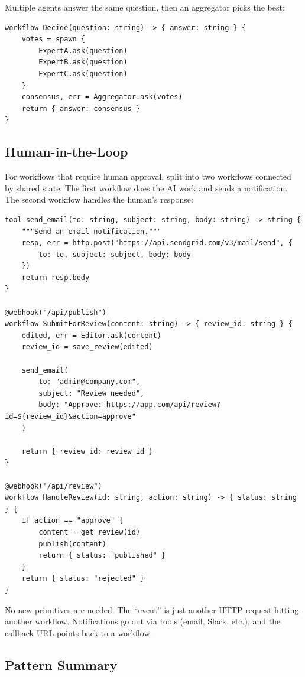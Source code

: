 Multiple agents answer the same question, then an aggregator picks the best:

\begin{lstlisting}
workflow Decide(question: string) -> { answer: string } {
    votes = spawn {
        ExpertA.ask(question)
        ExpertB.ask(question)
        ExpertC.ask(question)
    }
    consensus, err = Aggregator.ask(votes)
    return { answer: consensus }
}
\end{lstlisting}

\subsection{Human-in-the-Loop}

For workflows that require human approval, split into two workflows connected by shared state. The first workflow does the AI work and sends a notification. The second workflow handles the human's response:

\begin{lstlisting}
tool send_email(to: string, subject: string, body: string) -> string {
    """Send an email notification."""
    resp, err = http.post("https://api.sendgrid.com/v3/mail/send", {
        to: to, subject: subject, body: body
    })
    return resp.body
}

@webhook("/api/publish")
workflow SubmitForReview(content: string) -> { review_id: string } {
    edited, err = Editor.ask(content)
    review_id = save_review(edited)

    send_email(
        to: "admin@company.com",
        subject: "Review needed",
        body: "Approve: https://app.com/api/review?id=${review_id}&action=approve"
    )

    return { review_id: review_id }
}

@webhook("/api/review")
workflow HandleReview(id: string, action: string) -> { status: string } {
    if action == "approve" {
        content = get_review(id)
        publish(content)
        return { status: "published" }
    }
    return { status: "rejected" }
}
\end{lstlisting}

No new primitives are needed. The ``event'' is just another HTTP request hitting another workflow. Notifications go out via tools (email, Slack, etc.), and the callback URL points back to a  workflow.

\subsection{Pattern Summary}

